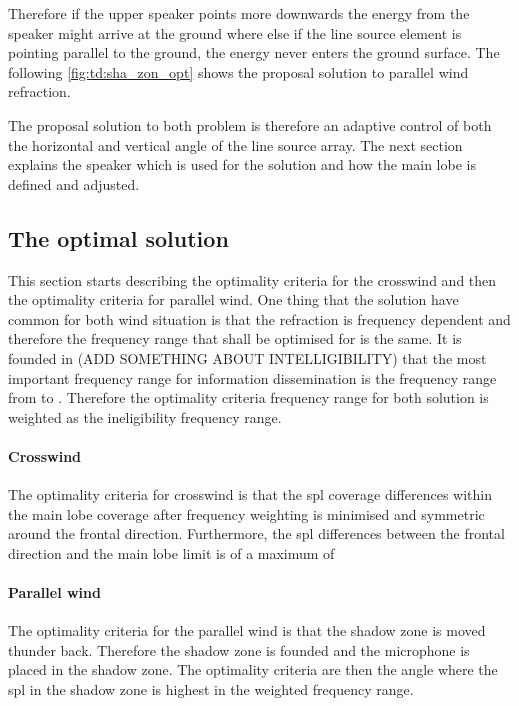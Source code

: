 Therefore if the upper speaker points more downwards the energy from the speaker might arrive at the ground where else if the line source element is pointing parallel to the ground, the energy never enters the ground surface. The following \autoref{fig:td:sha_zon_opt} shows the proposal solution to parallel wind refraction.  


The proposal solution to both problem is therefore an adaptive control of both the horizontal and vertical angle of the line source array. The next section explains the speaker which is used for the solution and how the main lobe is defined and adjusted.



\subsection{The optimal solution}
This section starts describing the optimality criteria for the crosswind and then the optimality criteria for parallel wind. One thing that the solution have common for both wind situation is that the refraction is frequency dependent and therefore the frequency range that shall be optimised for is the same. It is founded in (ADD SOMETHING ABOUT INTELLIGIBILITY) that the most important frequency range for information dissemination is the frequency range from  to . Therefore the optimality criteria frequency range for both solution is weighted as the ineligibility frequency range. 

\paragraph{Crosswind} The optimality criteria for crosswind is that the \gls{spl} coverage differences within the main lobe coverage after frequency weighting is minimised and symmetric around the frontal direction. Furthermore, the \gls{spl} differences between the frontal direction and the main lobe limit is of a maximum of 

\paragraph{Parallel wind} The optimality criteria for the parallel wind is that the shadow zone is moved thunder back. Therefore the shadow zone is founded and the microphone is placed in the shadow zone. The optimality criteria are then the angle where the \gls{spl} in the shadow zone is highest in the weighted frequency range. 
